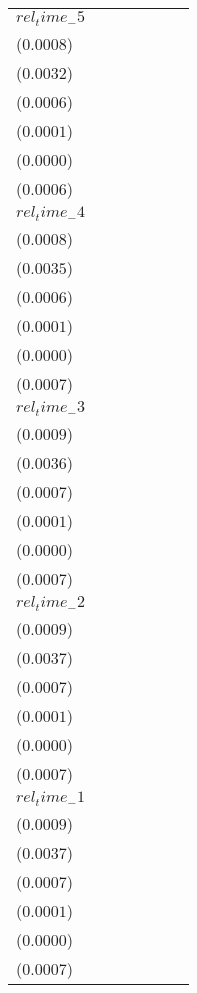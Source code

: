 \begin{tabular}{lllllll}
$rel_time_-5$ & \makecell{$0.0004^{}$ \\ ($0.0008$)} & \makecell{$0.0016^{}$ \\ ($0.0032$)} & \makecell{$0.0036^{***}$ \\ ($0.0006$)} & \makecell{$0.0003^{***}$ \\ ($0.0001$)} & \makecell{$0.0001^{***}$ \\ ($0.0000$)} & \makecell{$0.0005^{}$ \\ ($0.0006$)} \\
$rel_time_-4$ & \makecell{$0.0004^{}$ \\ ($0.0008$)} & \makecell{$0.0018^{}$ \\ ($0.0035$)} & \makecell{$0.0020^{***}$ \\ ($0.0006$)} & \makecell{$0.0002^{**}$ \\ ($0.0001$)} & \makecell{$0.0001^{***}$ \\ ($0.0000$)} & \makecell{$0.0006^{}$ \\ ($0.0007$)} \\
$rel_time_-3$ & \makecell{$0.0012^{}$ \\ ($0.0009$)} & \makecell{$0.0046^{}$ \\ ($0.0036$)} & \makecell{$-0.0015^{**}$ \\ ($0.0007$)} & \makecell{$-0.0001^{}$ \\ ($0.0001$)} & \makecell{$-0.0000^{}$ \\ ($0.0000$)} & \makecell{$0.0006^{}$ \\ ($0.0007$)} \\
$rel_time_-2$ & \makecell{$0.0002^{}$ \\ ($0.0009$)} & \makecell{$-0.0000^{}$ \\ ($0.0037$)} & \makecell{$-0.0013^{*}$ \\ ($0.0007$)} & \makecell{$-0.0000^{}$ \\ ($0.0001$)} & \makecell{$-0.0000^{}$ \\ ($0.0000$)} & \makecell{$-0.0003^{}$ \\ ($0.0007$)} \\
$rel_time_-1$ & \makecell{$0.0013^{}$ \\ ($0.0009$)} & \makecell{$0.0055^{}$ \\ ($0.0037$)} & \makecell{$0.0029^{***}$ \\ ($0.0007$)} & \makecell{$0.0003^{***}$ \\ ($0.0001$)} & \makecell{$0.0001^{***}$ \\ ($0.0000$)} & \makecell{$0.0012^{}$ \\ ($0.0007$)} \\

\end{tabular}
